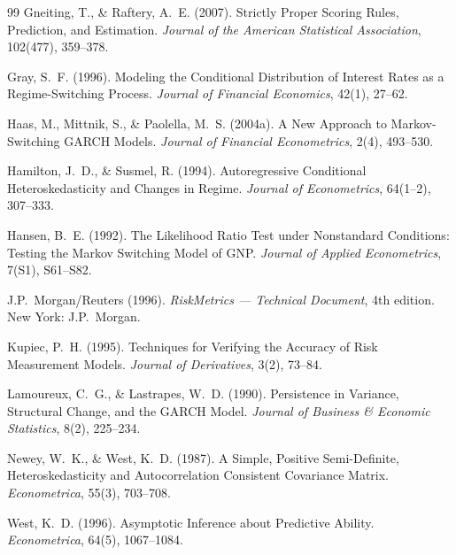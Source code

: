\documentclass[12pt,a4paper]{article}
\begin{document}
\begin{thebibliography}{99}
	Gneiting, T., \& Raftery, A.~E. (2007). Strictly Proper Scoring Rules, Prediction, and Estimation. \textit{Journal of the American Statistical Association}, 102(477), 359--378.

	Gray, S.~F. (1996). Modeling the Conditional Distribution of Interest
	Rates as a Regime-Switching Process. \textit{Journal of Financial
		Economics}, 42(1), 27--62.

	Haas, M., Mittnik, S., \& Paolella, M.~S. (2004a). A New Approach to
	Markov-Switching GARCH Models. \textit{Journal of Financial
		Econometrics}, 2(4), 493--530.

	Hamilton, J.~D., \& Susmel, R. (1994). Autoregressive Conditional
	Heteroskedasticity and Changes in Regime. \textit{Journal of
		Econometrics}, 64(1--2), 307--333.

	Hansen, B.~E. (1992). The Likelihood Ratio Test under Nonstandard Conditions: Testing the Markov Switching Model of GNP. \textit{Journal of Applied Econometrics}, 7(S1), S61--S82.

	J.P.~Morgan/Reuters (1996). \textit{RiskMetrics --- Technical Document}, 4th edition. New York: J.P.~Morgan.

	Kupiec, P.~H. (1995). Techniques for Verifying the Accuracy of Risk Measurement Models. \textit{Journal of Derivatives}, 3(2), 73--84.

	Lamoureux, C.~G., \& Lastrapes, W.~D. (1990). Persistence in Variance, Structural Change, and the GARCH Model. \textit{Journal of Business \& Economic Statistics}, 8(2), 225--234.
	

	Newey, W.~K., \& West, K.~D. (1987). A Simple, Positive Semi-Definite, Heteroskedasticity and Autocorrelation Consistent Covariance Matrix. \textit{Econometrica}, 55(3), 703--708.
	

	West, K.~D. (1996). Asymptotic Inference about Predictive Ability.
	\textit{Econometrica}, 64(5), 1067--1084.
	
	

\end{thebibliography}
\end{document}
